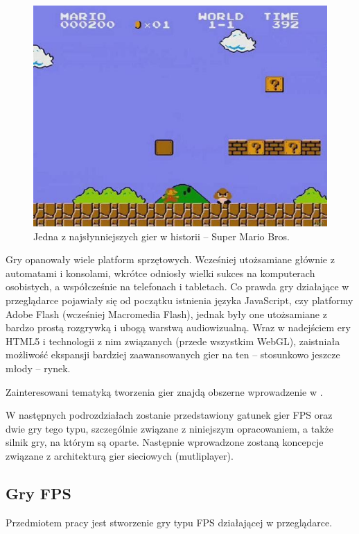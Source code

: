\begin{figure}[h]
  \centering
  \includegraphics[scale=0.5]{zasoby/rozdzial2/mario}  
  \caption{Jedna z najsłynniejszych gier w historii -- Super Mario Bros.}
  \label{fig:mario}
\end{figure}

Gry opanowały wiele platform sprzętowych. Wcześniej utożsamiane głównie z automatami i konsolami,
wkrótce odniosły wielki sukces na komputerach osobistych,
a współcześnie na telefonach i tabletach.
Co prawda gry działające w przeglądarce pojawiały się od początku istnienia języka JavaScript,
czy platformy Adobe Flash (wcześniej Macromedia Flash), jednak były one utożsamiane
z bardzo prostą rozgrywką i ubogą warstwą audiowizualną. Wraz w nadejściem ery HTML5
i technologii z nim związanych (przede wszystkim WebGL), zaistniała możliwość ekspansji
bardziej zaawansowanych gier na ten -- stosunkowo jeszcze młody -- rynek.

Zainteresowani tematyką tworzenia gier znajdą obszerne wprowadzenie w \cite{game-engine}.

W następnych podrozdziałach zostanie przedstawiony gatunek gier FPS oraz dwie gry tego typu,
szczególnie związane z niniejszym opracowaniem, a także silnik gry, na którym są oparte.
Następnie wprowadzone zostaną koncepcje związane z architekturą gier sieciowych (mutliplayer).

\subsection{Gry FPS}

Przedmiotem pracy jest stworzenie gry typu FPS działającej w przeglądarce. 

